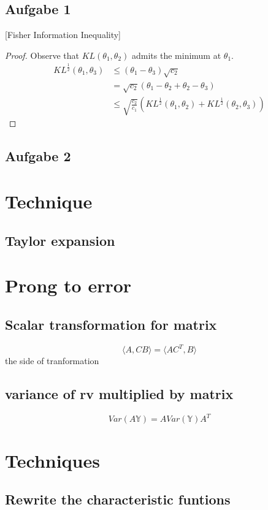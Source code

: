 \documentclass[a4paper,11pt]{article}
\theoremstyle{definition}
\theoremstyle{remark}
\begin{document}
\subsection*{Aufgabe 1}[Fisher Information Inequality]
\begin{proof}
Observe that $KL(\theta_1, \theta_2)$ admits the minimum at $\theta_1$.
	\begin{align*}
		KL^{\frac{1}{2}} (\theta_1, \theta_3) &\leq (\theta_1 - \theta_3)\sqrt{c_2}\\
		&= \sqrt{c_2} (\theta_1 - \theta_2 + \theta_2 - \theta_3)\\
		&\leq \sqrt{\frac{c_2}{c_1}} (KL^{\frac{1}{2}}(\theta_1, \theta_2) + KL^{\frac{1}{2}}(\theta_2, \theta_3))
	\end{align*}
\end{proof}



\subsection*{Aufgabe 2}


\section{Technique}
\subsection{Taylor expansion}

\section{Prong to error}
\subsection{Scalar transformation for matrix}
\begin{equation*}
	\langle A, CB \rangle = \langle AC^T, B\rangle
\end{equation*}
the side of tranformation

\subsection{variance of rv multiplied by matrix}
\begin{equation*}
	Var(A\mathbb{Y}) = A Var(\mathbb{Y}) A^T
\end{equation*}

\section{Techniques}
\subsection{Rewrite the characteristic funtions}
\end{document}
